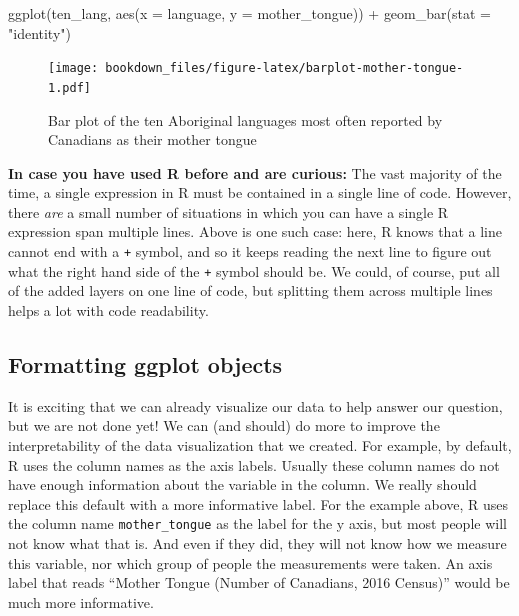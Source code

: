 \documentclass[
  12pt,
]{krantz}
\newenvironment{Shaded}{\begin{snugshade}}{\end{snugshade}}
\newcommand{\AttributeTok}[1]{\textcolor[rgb]{0.61,0.61,0.61}{#1}}
\newcommand{\FunctionTok}[1]{\textcolor[rgb]{0,0,0}{#1}}
\newcommand{\NormalTok}[1]{#1}
\newcommand{\SpecialCharTok}[1]{\textcolor[rgb]{0,0,0}{#1}}
\newcommand{\StringTok}[1]{\textcolor[rgb]{0.5,0.5,0.5}{#1}}
\renewenvironment{quote}{\begin{VF}}{\end{VF}}
\begin{document}
\begin{Shaded}
\begin{Highlighting}[]
\FunctionTok{ggplot}\NormalTok{(ten\_lang, }\FunctionTok{aes}\NormalTok{(}\AttributeTok{x =}\NormalTok{ language, }\AttributeTok{y =}\NormalTok{ mother\_tongue)) }\SpecialCharTok{+}
  \FunctionTok{geom\_bar}\NormalTok{(}\AttributeTok{stat =} \StringTok{"identity"}\NormalTok{)}
\end{Highlighting}
\end{Shaded}

\begin{figure}
\centering
\texttt{[image: bookdown\_files/figure-latex/barplot-mother-tongue-1.pdf]}
\caption{\label{fig:barplot-mother-tongue}Bar plot of the ten Aboriginal languages most often reported by Canadians as their mother tongue}
\end{figure}

\begin{quote}
\textbf{In case you have used R before and are curious:} The vast majority of the
time, a single expression in R must be contained in a single line of code.
However, there \emph{are} a small number of situations in which you can have a
single R expression span multiple lines. Above is one such case: here, R knows that a line cannot
end with a \texttt{+} symbol,  and so it keeps reading the next line to figure out
what the right hand side of the \texttt{+} symbol should be. We could, of course,
put all of the added layers on one line of code, but splitting them across
multiple lines helps a lot with code readability. 
\end{quote}

\hypertarget{formatting-ggplot-objects}{%
\subsection{Formatting ggplot objects}\label{formatting-ggplot-objects}}

It is exciting that we can already visualize our data to help answer our
question, but we are not done yet! We can (and should) do more to improve the
interpretability of the data visualization that we created. For example, by
default, R uses the column names as the axis labels. Usually these
column names do not have enough information about the variable in the column.
We really should replace this default with a more informative label. For the
example above, R uses the column name \texttt{mother\_tongue} as the label for the
y axis, but most people will not know what that is. And even if they did, they
will not know how we measure this variable, nor which group of people the
measurements were taken. An axis label that reads ``Mother Tongue (Number of
Canadians, 2016 Census)'' would be much more informative.
\end{document}
